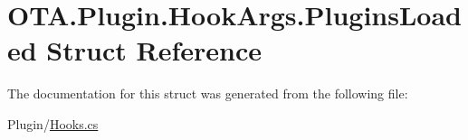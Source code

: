 \hypertarget{struct_o_t_a_1_1_plugin_1_1_hook_args_1_1_plugins_loaded}{}\section{O\+T\+A.\+Plugin.\+Hook\+Args.\+Plugins\+Loaded Struct Reference}
\label{struct_o_t_a_1_1_plugin_1_1_hook_args_1_1_plugins_loaded}


The documentation for this struct was generated from the following file\+:\begin{DoxyCompactItemize}
\item 
Plugin/\hyperlink{_hooks_8cs}{Hooks.\+cs}\end{DoxyCompactItemize}
